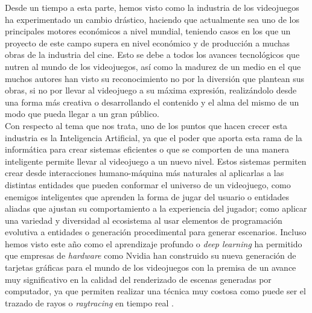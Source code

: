 Desde un tiempo a esta parte, hemos visto como la industria de los videojuegos ha experimentado un cambio drástico, haciendo que actualmente sea uno de los principales motores económicos a nivel mundial, teniendo casos en los que un proyecto de este campo supera en nivel económico y de producción a muchas obras de la industria del cine. Esto se debe a todos los avances tecnológicos que nutren al mundo de los videojuegos, así como la madurez de un medio en el que muchos autores han visto su reconocimiento no por la diversión que plantean sus obras, si no por llevar al videojuego a su máxima expresión, realizándolo desde una forma más creativa o desarrollando el contenido y el alma del mismo de un modo que pueda llegar a un gran público. \\

Con respecto al tema que nos trata, uno de los puntos que hacen crecer esta industria es la Inteligencia Artificial, ya que el poder que aporta esta rama de la informática para crear sistemas eficientes o que se comporten de una manera inteligente permite llevar al videojuego a un nuevo nivel. Estos sistemas permiten crear desde interacciones humano-máquina más naturales al aplicarlas a las distintas entidades que pueden conformar el universo de un videojuego, como enemigos inteligentes que aprenden la forma de jugar del usuario o entidades aliadas que ajustan su comportamiento a la experiencia del jugador; como aplicar una variedad y diversidad al ecosistema al usar elementos de programación evolutiva a entidades \cite{5286468} o generación procedimental \cite{parkin_2016} para generar escenarios. Incluso hemos visto este año como el aprendizaje profundo o \textit{deep learning} ha permitido que empresas de \textit{hardware} como Nvidia han construido su nueva generación de tarjetas gráficas para el mundo de los videojuegos con la premisa de un avance muy significativo en la calidad del renderizado de escenas generadas por computador, ya que permiten realizar una técnica muy costosa como puede ser el trazado de rayos o \textit{raytracing} \cite{Whitted:1980:IIM:358876.358882} en tiempo real \cite{Parker:2013:GRT:2447976.2447997}. \\

